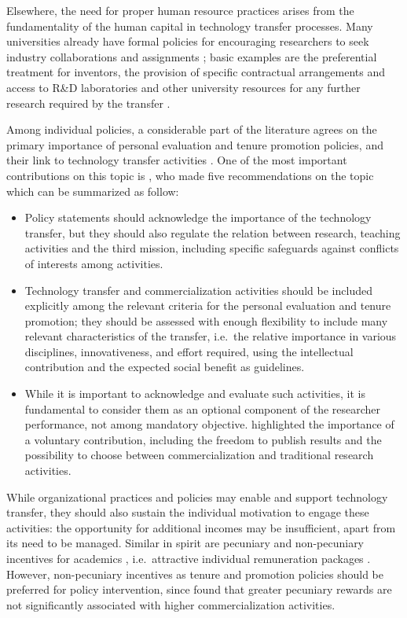Elsewhere, the need for proper human resource practices arises from the fundamentality of the human capital in technology transfer processes. Many universities already have formal policies for encouraging researchers to seek industry collaborations and assignments \citep{DEste2011}; basic examples are the preferential treatment for inventors, the provision of specific contractual arrangements and access to R\&D laboratories and other university resources for any further research required by the transfer \citep{Fini2009}.

Among individual policies, a considerable part of the literature agrees on the primary importance of personal evaluation and tenure promotion policies, and their link to technology transfer activities \citep{Debackere2005}. One of the most important contributions on this topic is \citet{Genshaft2016}, who made five recommendations on the topic which can be summarized as follow:

\begin{itemize}
\item Policy statements should acknowledge the importance of the technology transfer, but they should also regulate the relation between research, teaching activities and the third mission, including specific safeguards against conflicts of interests among activities.
\item Technology transfer and commercialization activities should be included explicitly among the relevant criteria for the personal evaluation and tenure promotion; they should be assessed with enough flexibility to include many relevant characteristics of the transfer, i.e.\ the relative importance in various disciplines, innovativeness, and effort required, using the intellectual contribution and the expected social benefit as guidelines. 
\item While it is important to acknowledge and evaluate such activities, it is fundamental to consider them as an optional component of the researcher performance, not among mandatory objective. \citet{Rasmussen2006} highlighted the importance of a voluntary contribution, including the freedom to publish results and the possibility to choose between commercialization and traditional research activities. 
\end{itemize}

While organizational practices and policies may enable and support technology transfer, they should also sustain the individual motivation to engage these activities: the opportunity for additional incomes may be insufficient, apart from its need to be managed. Similar in spirit are pecuniary and non-pecuniary incentives for academics \citep{Link2007}, i.e.\ attractive individual remuneration packages \citep{Debackere2005}. However, non-pecuniary incentives as tenure and promotion policies should be preferred for policy intervention, since \citet{Friedman2003} found that greater pecuniary rewards are not significantly associated with higher commercialization activities.


